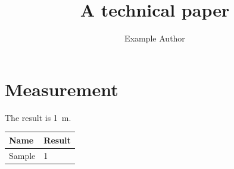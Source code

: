 \documentclass{IEEEtran}
\begin{document}
\title{A technical paper}\author{Example Author}\maketitle
\section{Measurement}The result is \qty{1}{\metre}.
\begin{tabular}{ll}\toprule Name & Result\\\midrule Sample & 1\\\bottomrule\end{tabular}
\end{document}
